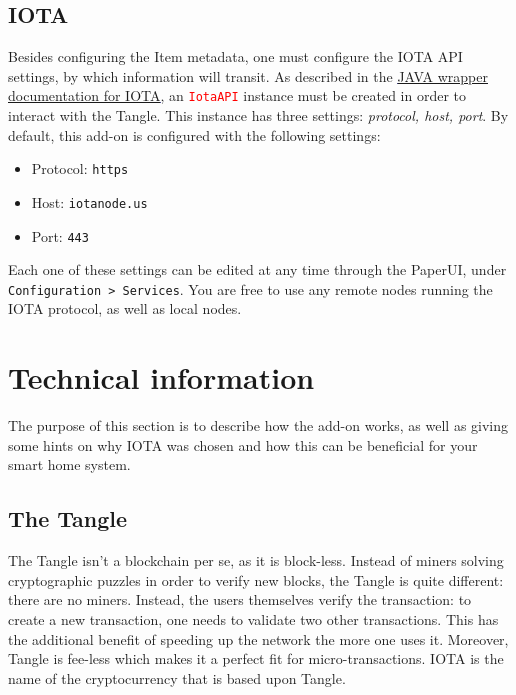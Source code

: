 \documentclass[a4paper,10pt]{article}
\begin{document}
\subsection{IOTA}

\noindent Besides configuring the Item metadata, one must configure the IOTA API settings, by which information will transit. As described in the \textcolor{blue}{\underline{\href{https://github.com/iotaledger/iota.lib.java}{JAVA wrapper documentation for IOTA}}}, an \texttt{\textcolor{red}{IotaAPI}} instance must be created in order to interact with the Tangle. This instance has three settings: \textit{protocol, host, port}. By default, this add-on is configured with the following settings: \\

\begin{itemize}
	\item Protocol: \texttt{https}
	\item Host: \texttt{iotanode.us}
	\item Port: \texttt{443}
\end{itemize} 

\bigskip

\noindent Each one of these settings can be edited at any time through the PaperUI, under \texttt{Configuration > Services}. You are free to use any remote nodes running the IOTA protocol, as well as local nodes. 

\section{Technical information}

The purpose of this section is to describe how the add-on works, as well as giving some hints on why IOTA was chosen and how this can be beneficial for your smart home system.

\subsection{The Tangle}

The Tangle isn’t a blockchain per se, as it is block-less. Instead of miners solving cryptographic puzzles in order to verify new blocks, the Tangle is quite different: there are no miners. Instead, the users themselves verify the transaction: to create a new transaction, one needs to validate two other transactions. This has the additional benefit of speeding up the network the more one uses it. Moreover, Tangle is fee-less which makes it a perfect fit for micro-transactions. IOTA is the name of the cryptocurrency that is based upon Tangle. \\
\end{document}
